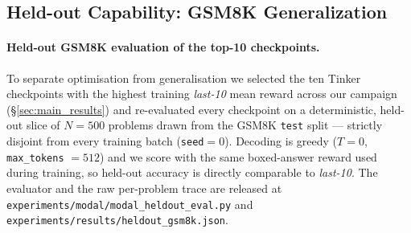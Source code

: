 \subsection{Held-out Capability: GSM8K Generalization}
\paragraph{Held-out GSM8K evaluation of the top-10 checkpoints.}
To separate optimisation from generalisation we selected the ten Tinker
checkpoints with the highest training \emph{last-10} mean reward across our
campaign (\S\ref{sec:main_results}) and re-evaluated every checkpoint on a
deterministic, held-out slice of $N=500$ problems drawn from the GSM8K
\texttt{test} split --- strictly disjoint from every training batch
(\texttt{seed}$=0$). Decoding is greedy ($T{=}0$, \texttt{max\_tokens}
$=512$) and we score with the same boxed-answer reward used during training,
so held-out accuracy is directly comparable to \emph{last-10}.
The evaluator and the raw per-problem trace are released at
\texttt{experiments/modal/modal\_heldout\_eval.py} and
\texttt{experiments/results/heldout\_gsm8k.json}.


